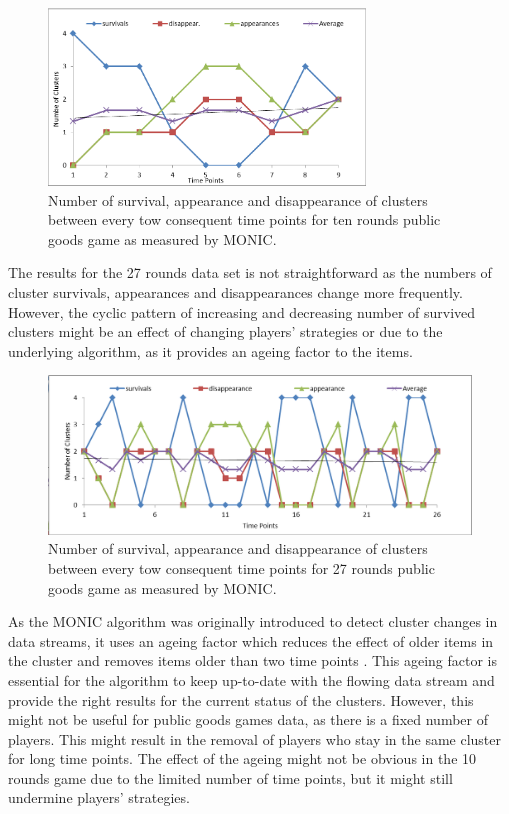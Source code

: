 \begin{figure}[!h]
    \centering
    \includegraphics[width=0.75\textwidth]{images/chapter4/monic10.png}
    \caption{Number of survival, appearance and disappearance of clusters between every tow consequent time points for ten rounds public goods game as measured by MONIC.}
    \label{fig:monic10}
\end{figure}

The results for the 27 rounds data set is not straightforward as the numbers of cluster survivals, appearances and disappearances change more frequently. However, the cyclic pattern of increasing and decreasing number of survived clusters might be an effect of changing players' strategies or due to the underlying algorithm, as it provides an ageing factor to the items.

\begin{figure}[th]
    \centering
    \includegraphics[width=1.0\textwidth]{images/chapter4/monic27.png}
    \caption{Number of survival, appearance and disappearance of clusters between every tow consequent time points for 27 rounds public goods game as  measured by MONIC.}
    \label{fig:monic27}
\end{figure}

As the MONIC algorithm was originally introduced to detect cluster changes in data streams, it uses an ageing factor which reduces the effect of older items in the cluster and removes items older than two time points \cite{Spiliopoulou2006}. This ageing factor is essential for the algorithm to keep up-to-date with the flowing data stream and provide the right results for the current status of the clusters. However, this might not be useful for public goods games data, as there is a fixed number of players. This might result in the removal of players who stay in the same cluster for long time points. The effect of the ageing might not be obvious in the 10 rounds game due to the limited number of time points, but it might still undermine players' strategies.
                                 
